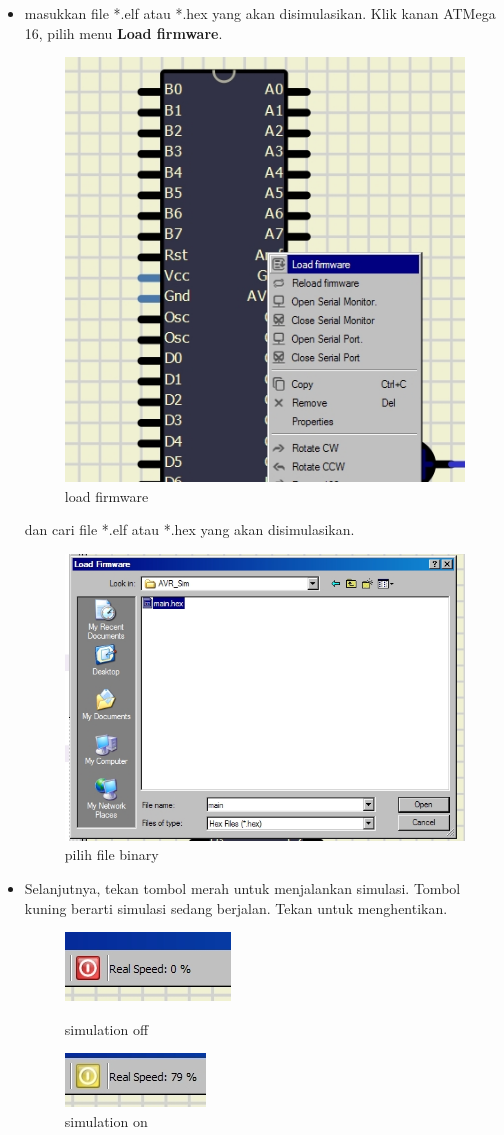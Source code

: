 \documentclass[12pt,]{article}
\begin{document}
\begin{itemize}
		\item masukkan file *.elf atau *.hex yang akan disimulasikan.
		Klik kanan ATMega 16, pilih menu \textbf{Load firmware}.

		\begin{figure}[H]
			\centering
			\includegraphics[width=0.5\linewidth]{images/tessim_2}
			\caption{load firmware}
		\end{figure}

		dan cari file *.elf atau *.hex yang akan disimulasikan.

		\begin{figure}[H]
			\centering
			\includegraphics[width=0.5\linewidth]{images/tessim_3}
			\caption{pilih file binary}
		\end{figure}

		\item Selanjutnya, tekan tombol merah untuk menjalankan simulasi.
		Tombol kuning berarti simulasi sedang berjalan. Tekan untuk menghentikan.

		\begin{figure}[H]
			\centering
			\includegraphics[width=0.25\linewidth]{images/tessim_off}
			\caption{simulation off}
			\includegraphics[width=0.25\linewidth]{images/tessim_on}
			\caption{simulation on}
		\end{figure}


\end{itemize}
\end{document}
